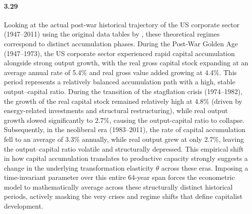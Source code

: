 \paragraph{3.29}
Looking at the actual post-war historical trajectory of the US corporate sector (1947--2011) using the original data tables by \citet{Shaikh2016}, these theoretical regimes correspond to distinct accumulation phases. During the Post-War Golden Age (1947--1973), the US corporate sector experienced rapid capital accumulation alongside strong output growth, with the real gross capital stock expanding at an average annual rate of 5.4\% and real gross value added growing at 4.4\%. This period represents a relatively balanced accumulation path with a high, stable output--capital ratio. During the transition of the stagflation crisis (1974--1982), the growth of the real capital stock remained relatively high at 4.8\% (driven by energy-related investments and structural restructuring), while real output growth slowed significantly to 2.7\%, causing the output-capital ratio to collapse. Subsequently, in the neoliberal era (1983--2011), the rate of capital accumulation fell to an average of 3.3\% annually, while real output grew at only 2.7\%, leaving the output--capital ratio volatile and structurally depressed. This empirical shift in how capital accumulation translates to productive capacity strongly suggests a change in the underlying transformation elasticity $\theta$ across these eras. Imposing a time-invariant parameter over this entire 64-year span forces the econometric model to mathematically average across these structurally distinct historical periods, actively masking the very crises and regime shifts that define capitalist development.

